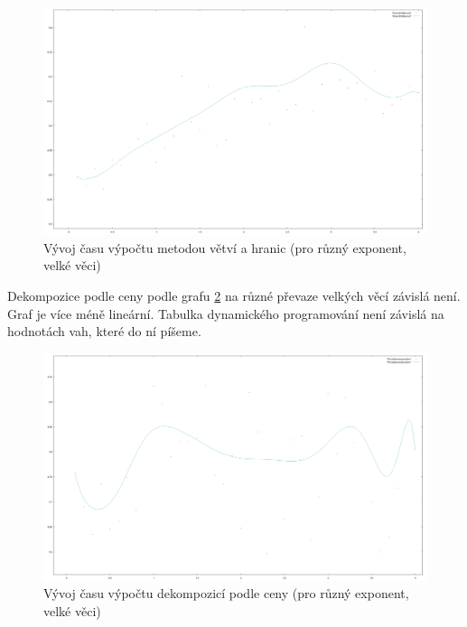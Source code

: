 \documentclass[12pt,a4paper]{article}
\begin{document}
\begin{figure}[H]
\begin{center}
\includegraphics[width=\textwidth]{exp/big/BranchNBound}
\caption{Vývoj času výpočtu metodou větví a hranic (pro různý exponent, velké věci)}
\label{exp/big/BranchNBound}
\end{center}
\end{figure}

Dekompozice podle ceny podle grafu \ref{exp/big/PriceDecomposition} na různé převaze velkých věcí závislá není. Graf je více méně lineární. Tabulka dynamického programování není závislá na hodnotách vah, které do ní píšeme.

\begin{figure}[H]
\begin{center}
\includegraphics[width=\textwidth]{exp/big/PriceDecomposition}
\caption{Vývoj času výpočtu dekompozicí podle ceny (pro různý exponent, velké věci)}
\label{exp/big/PriceDecomposition}
\end{center}
\end{figure}
\end{document}
